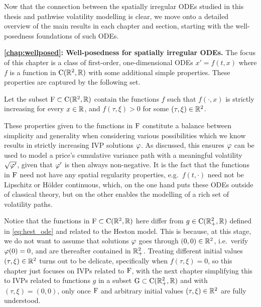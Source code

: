 \vspace{2mm}Now that the connection between the spatially irregular ODEs studied in this thesis and pathwise volatility modelling is clear, we move onto a detailed overview of the main results in each chapter and section, starting with the well-posedness foundations of such ODEs.

\vspace{3mm}\textbf{\autoref{chap:wellposed}: Well-posedness for spatially irregular ODEs.} The focus of this chapter is a class of first-order, one-dimensional ODEs $x'=f(t,x)$ where $f$ is a function in $\mathrm{C}(\mathbb{R}^2,\mathbb{R})$ with some additional simple properties. These properties are captured by the following set.
\begin{definition}\label{def:driving_func}
    Let the subset $\mathrm{F}\subset\mathrm{C}(\mathbb{R}^2,\mathbb{R})$ contain the functions $f$ such that $f(\cdot,x)$ is strictly increasing for every $x\in\mathbb{R}$, and $f(\tau,\xi)>0$ for some $(\tau,\xi)\in\mathbb{R}^2$.
\end{definition}

These properties given to the functions in $\mathrm{F}$ constitute a balance between simplicity and generality when considering various possibilities which we know results in strictly increasing IVP solutions $\varphi$. As discussed, this ensures $\varphi$ can be used to model a price's cumulative variance path with a meaningful volatility $\sqrt{\varphi'}$, given that $\varphi'$ is then always non-negative. It is the fact that the functions in $\mathrm{F}$ need not have any spatial regularity properties, e.g.~$f(t,\cdot)$ need not be Lipschitz or H\"older continuous, which, on the one hand puts these ODEs outside of classical theory, but on the other enables the modelling of a rich set of volatility paths.

Notice that the functions in $\mathrm{F}\subset\mathrm{C}(\mathbb{R}^2,\mathbb{R})$ here differ from $g\in\mathrm{C}(\mathbb{R}_+^2,\mathbb{R})$ defined in \autoref{eq:hest_ode} and related to the Heston model. This is because, at this stage, we do not want to assume that solutions $\varphi$ goes through $(0,0)\in\mathbb{R}^2$, i.e.~verify $\varphi(0)=0$, and are thereafter contained in $\mathbb{R}^2_+$. Treating different initial values $(\tau,\xi)\in\mathbb{R}^2$ turns out to be delicate, specifically when $f(\tau,\xi)=0$, so this chapter just focuses on IVPs related to $\mathrm{F}$, with the next chapter simplifying this to IVPs related to functions $g$ in a subset $\mathrm{G}\subset\mathrm{C}(\mathbb{R}_+^2,\mathbb{R})$ and with $(\tau,\xi)=(0,0)$, only once $\mathrm{F}$ and arbitrary initial values $(\tau,\xi)\in\mathbb{R}^2$ are fully understood.

